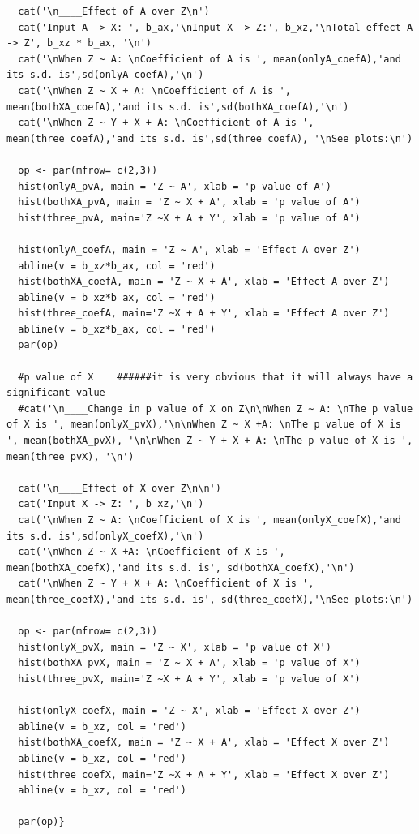 \documentclass{article}
\begin{document}
\begin{lstlisting}
  cat('\n____Effect of A over Z\n')
  cat('Input A -> X: ', b_ax,'\nInput X -> Z:', b_xz,'\nTotal effect A -> Z', b_xz * b_ax, '\n')
  cat('\nWhen Z ~ A: \nCoefficient of A is ', mean(onlyA_coefA),'and its s.d. is',sd(onlyA_coefA),'\n')
  cat('\nWhen Z ~ X + A: \nCoefficient of A is ', mean(bothXA_coefA),'and its s.d. is',sd(bothXA_coefA),'\n')
  cat('\nWhen Z ~ Y + X + A: \nCoefficient of A is ', mean(three_coefA),'and its s.d. is',sd(three_coefA), '\nSee plots:\n')
  
  op <- par(mfrow= c(2,3))
  hist(onlyA_pvA, main = 'Z ~ A', xlab = 'p value of A')
  hist(bothXA_pvA, main = 'Z ~ X + A', xlab = 'p value of A')
  hist(three_pvA, main='Z ~X + A + Y', xlab = 'p value of A')
  
  hist(onlyA_coefA, main = 'Z ~ A', xlab = 'Effect A over Z')
  abline(v = b_xz*b_ax, col = 'red')
  hist(bothXA_coefA, main = 'Z ~ X + A', xlab = 'Effect A over Z')
  abline(v = b_xz*b_ax, col = 'red')
  hist(three_coefA, main='Z ~X + A + Y', xlab = 'Effect A over Z')
  abline(v = b_xz*b_ax, col = 'red')
  par(op)
  
  #p value of X    ######it is very obvious that it will always have a significant value
  #cat('\n____Change in p value of X on Z\n\nWhen Z ~ A: \nThe p value of X is ', mean(onlyX_pvX),'\n\nWhen Z ~ X +A: \nThe p value of X is ', mean(bothXA_pvX), '\n\nWhen Z ~ Y + X + A: \nThe p value of X is ', mean(three_pvX), '\n')
  
  cat('\n____Effect of X over Z\n\n')
  cat('Input X -> Z: ', b_xz,'\n')
  cat('\nWhen Z ~ A: \nCoefficient of X is ', mean(onlyX_coefX),'and its s.d. is',sd(onlyX_coefX),'\n')
  cat('\nWhen Z ~ X +A: \nCoefficient of X is ', mean(bothXA_coefX),'and its s.d. is', sd(bothXA_coefX),'\n')
  cat('\nWhen Z ~ Y + X + A: \nCoefficient of X is ', mean(three_coefX),'and its s.d. is', sd(three_coefX),'\nSee plots:\n')
  
  op <- par(mfrow= c(2,3))
  hist(onlyX_pvX, main = 'Z ~ X', xlab = 'p value of X')
  hist(bothXA_pvX, main = 'Z ~ X + A', xlab = 'p value of X')
  hist(three_pvX, main='Z ~X + A + Y', xlab = 'p value of X')
  
  hist(onlyX_coefX, main = 'Z ~ X', xlab = 'Effect X over Z')
  abline(v = b_xz, col = 'red')
  hist(bothXA_coefX, main = 'Z ~ X + A', xlab = 'Effect X over Z')
  abline(v = b_xz, col = 'red')
  hist(three_coefX, main='Z ~X + A + Y', xlab = 'Effect X over Z')
  abline(v = b_xz, col = 'red')
  
  par(op)}
\end{lstlisting}
\end{document}
